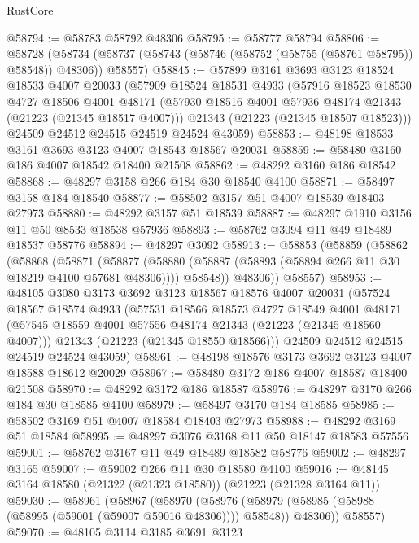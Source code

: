 \begin{lexlean}{RustCore}
\begin{coremodule}
@58794 := @58783 @58792 @48306
@58795 := @58777 @58794
@58806 := @58728
    (@58734 (@58737 (@58743 (@58746 (@58752 (@58755 (@58761 @58795)) @58548)) @48306)) @58557)
@58845 := @57899
    @3161
    @3693
    @3123
    @18524
    @18533
    @4007
    @20033
    (@57909
      @18524
      @18531
      @4933
      (@57916
        @18523
        @18530
        @4727
        @18506
        @4001
        @48171
        (@57930 @18516 @4001 @57936 @48174 @21343 (@21223 (@21345 @18517 @4007)))
        @21343
        (@21223 (@21345 @18507 @18523)))
      @24509
      @24512
      @24515
      @24519
      @24524
      @43059)
@58853 := @48198 @18533 @3161 @3693 @3123 @4007 @18543 @18567 @20031
@58859 := @58480 @3160 @186 @4007 @18542 @18400 @21508
@58862 := @48292 @3160 @186 @18542
@58868 := @48297 @3158 @266 @184 @30 @18540 @4100
@58871 := @58497 @3158 @184 @18540
@58877 := @58502 @3157 @51 @4007 @18539 @18403 @27973
@58880 := @48292 @3157 @51 @18539
@58887 := @48297 @1910 @3156 @11 @50 @8533 @18538 @57936
@58893 := @58762 @3094 @11 @49 @18489 @18537 @58776
@58894 := @48297 @3092
@58913 := @58853
    (@58859
      (@58862
        (@58868
          (@58871
            (@58877
              (@58880 (@58887 (@58893 (@58894 @266 @11 @30 @18219 @4100 @57681 @48306))))
              @58548))
          @48306))
      @58557)
@58953 := @48105
    @3080
    @3173
    @3692
    @3123
    @18567
    @18576
    @4007
    @20031
    (@57524
      @18567
      @18574
      @4933
      (@57531
        @18566
        @18573
        @4727
        @18549
        @4001
        @48171
        (@57545 @18559 @4001 @57556 @48174 @21343 (@21223 (@21345 @18560 @4007)))
        @21343
        (@21223 (@21345 @18550 @18566)))
      @24509
      @24512
      @24515
      @24519
      @24524
      @43059)
@58961 := @48198 @18576 @3173 @3692 @3123 @4007 @18588 @18612 @20029
@58967 := @58480 @3172 @186 @4007 @18587 @18400 @21508
@58970 := @48292 @3172 @186 @18587
@58976 := @48297 @3170 @266 @184 @30 @18585 @4100
@58979 := @58497 @3170 @184 @18585
@58985 := @58502 @3169 @51 @4007 @18584 @18403 @27973
@58988 := @48292 @3169 @51 @18584
@58995 := @48297 @3076 @3168 @11 @50 @18147 @18583 @57556
@59001 := @58762 @3167 @11 @49 @18489 @18582 @58776
@59002 := @48297 @3165
@59007 := @59002 @266 @11 @30 @18580 @4100
@59016 := @48145 @3164 @18580 (@21322 (@21323 @18580)) (@21223 (@21328 @3164 @11))
@59030 := @58961
    (@58967
      (@58970
        (@58976 (@58979 (@58985 (@58988 (@58995 (@59001 (@59007 @59016 @48306)))) @58548)) @48306))
      @58557)
@59070 := @48105
    @3114
    @3185
    @3691
    @3123

\end{coremodule}
\end{lexlean}
